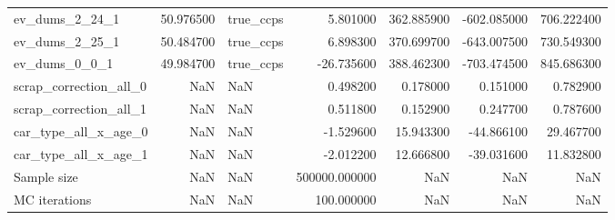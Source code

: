 \begin{tabular}{lrlrrrr}
ev_dums_2_24_1 & 50.976500 & true_ccps & 5.801000 & 362.885900 & -602.085000 & 706.222400 \\
ev_dums_2_25_1 & 50.484700 & true_ccps & 6.898300 & 370.699700 & -643.007500 & 730.549300 \\
ev_dums_0_0_1 & 49.984700 & true_ccps & -26.735600 & 388.462300 & -703.474500 & 845.686300 \\
scrap_correction_all_0 & NaN & NaN & 0.498200 & 0.178000 & 0.151000 & 0.782900 \\
scrap_correction_all_1 & NaN & NaN & 0.511800 & 0.152900 & 0.247700 & 0.787600 \\
car_type_all_x_age_0 & NaN & NaN & -1.529600 & 15.943300 & -44.866100 & 29.467700 \\
car_type_all_x_age_1 & NaN & NaN & -2.012200 & 12.666800 & -39.031600 & 11.832800 \\
Sample size & NaN & NaN & 500000.000000 & NaN & NaN & NaN \\
MC iterations & NaN & NaN & 100.000000 & NaN & NaN & NaN \\
\bottomrule
\end{tabular}
